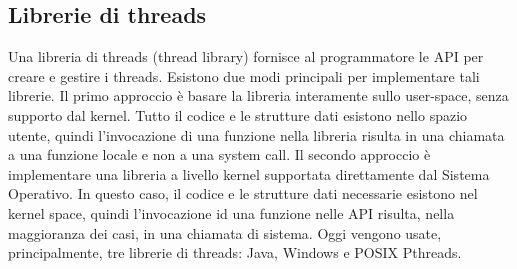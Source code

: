 \documentclass[a4]{article}
\begin{document}
\subsection{Librerie di threads}
Una libreria di threads (thread library) fornisce al programmatore le API per creare e gestire i threads. Esistono due modi principali per implementare tali librerie. Il primo approccio è basare la libreria interamente sullo user-space, senza supporto dal kernel. Tutto il codice e le strutture dati esistono nello spazio utente, quindi l'invocazione di una funzione nella libreria risulta in una chiamata a una funzione locale e non a una system call. \newline
Il secondo approccio è implementare una libreria a livello kernel supportata direttamente dal Sistema Operativo. In questo caso, il codice e le strutture dati necessarie esistono nel kernel space, quindi l'invocazione id una funzione nelle API risulta, nella maggioranza dei casi, in una chiamata di sistema.\newline
Oggi vengono usate, principalmente, tre librerie di threads: Java, Windows e POSIX Pthreads.
\end{document}

